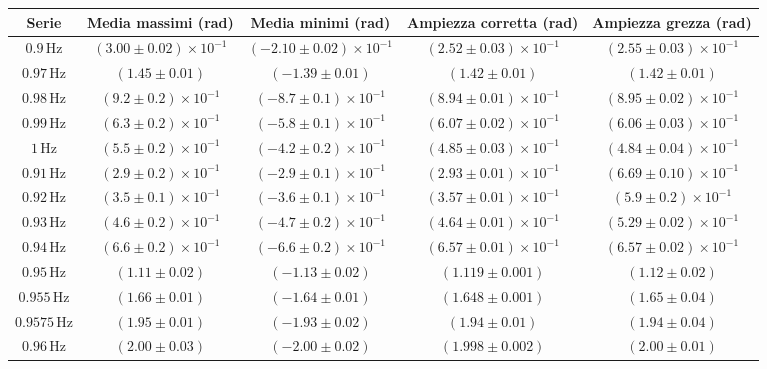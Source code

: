 \documentclass{article}
\begin{document}
\begin{table}[H]
\small
\centering
\begin{tabular}{|c|c|c|c|c|}
\toprule
\textbf{Serie} & \textbf{Media massimi (rad)} & \textbf{Media minimi (rad)} & \textbf{Ampiezza corretta (rad)} & \textbf{Ampiezza grezza (rad)} \\
\midrule
$0.9\,\text{Hz}$ & $(3.00 \pm 0.02) \times 10^{-1}$ & $(-2.10 \pm 0.02) \times 10^{-1}$ & $(2.52 \pm 0.03) \times 10^{-1}$ & $(2.55 \pm 0.03) \times 10^{-1}$ \\
$0.97\,\text{Hz}$ & $(1.45 \pm 0.01)$ & $(-1.39 \pm 0.01)$ & $(1.42 \pm 0.01)$ & $(1.42 \pm 0.01)$ \\
$0.98\,\text{Hz}$ & $(9.2 \pm 0.2) \times 10^{-1}$ & $(-8.7 \pm 0.1) \times 10^{-1}$ & $(8.94 \pm 0.01) \times 10^{-1}$ & $(8.95 \pm 0.02) \times 10^{-1}$ \\
$0.99\,\text{Hz}$ & $(6.3 \pm 0.2) \times 10^{-1}$ & $(-5.8 \pm 0.1) \times 10^{-1}$ & $(6.07 \pm 0.02) \times 10^{-1}$ & $(6.06 \pm 0.03) \times 10^{-1}$ \\
$1\,\text{Hz}$ & $(5.5 \pm 0.2) \times 10^{-1}$ & $(-4.2 \pm 0.2) \times 10^{-1}$ & $(4.85 \pm 0.03) \times 10^{-1}$ & $(4.84 \pm 0.04) \times 10^{-1}$ \\
\midrule
$0.91\,\text{Hz}$ & $(2.9 \pm 0.2) \times 10^{-1}$ & $(-2.9 \pm 0.1) \times 10^{-1}$ & $(2.93 \pm 0.01) \times 10^{-1}$ & $(6.69 \pm 0.10) \times 10^{-1}$ \\
$0.92\,\text{Hz}$ & $(3.5 \pm 0.1) \times 10^{-1}$ & $(-3.6 \pm 0.1) \times 10^{-1}$ & $(3.57 \pm 0.01) \times 10^{-1}$ & $(5.9 \pm 0.2) \times 10^{-1}$ \\
$0.93\,\text{Hz}$ & $(4.6 \pm 0.2) \times 10^{-1}$ & $(-4.7 \pm 0.2) \times 10^{-1}$ & $(4.64 \pm 0.01) \times 10^{-1}$ & $(5.29 \pm 0.02) \times 10^{-1}$ \\
$0.94\,\text{Hz}$ & $(6.6 \pm 0.2) \times 10^{-1}$ & $(-6.6 \pm 0.2) \times 10^{-1}$ & $(6.57 \pm 0.01) \times 10^{-1}$ & $(6.57 \pm 0.02) \times 10^{-1}$ \\
$0.95\,\text{Hz}$ & $(1.11 \pm 0.02)$ & $(-1.13 \pm 0.02)$ & $(1.119 \pm 0.001)$ & $(1.12 \pm 0.02)$ \\
$0.955\,\text{Hz}$ & $(1.66 \pm 0.01)$ & $(-1.64 \pm 0.01)$ & $(1.648 \pm 0.001)$ & $(1.65 \pm 0.04)$ \\
$0.9575\,\text{Hz}$ & $(1.95 \pm 0.01)$ & $(-1.93 \pm 0.02)$ & $(1.94 \pm 0.01)$ & $(1.94 \pm 0.04)$ \\
$0.96\,\text{Hz}$ & $(2.00 \pm 0.03)$ & $(-2.00 \pm 0.02)$ & $(1.998 \pm 0.002)$ & $(2.00 \pm 0.01)$ \\

\end{tabular}
\end{table}
\end{document}
